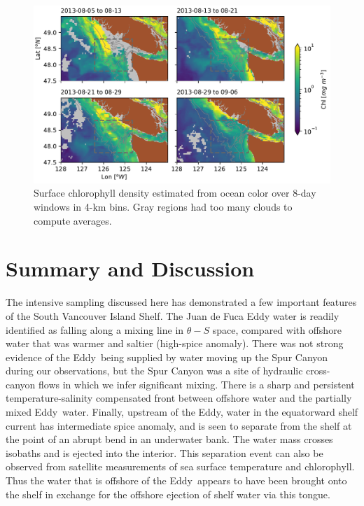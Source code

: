 \documentclass[draft]{agujournal2019}
\newcommand*{\Eddy}{{\sc Eddy}}
\begin{document}
\begin{figure}[htbp]
  \begin{center}
    \includegraphics[width=6.2in]{ChlA}
    \caption{Surface chlorophyll density estimated from ocean color \cite{Huetal12,MODISChlL3} over 8-day windows in 4-km bins. Gray regions had too many clouds to compute averages.
      \label{fig:ChlA} }
  \end{center}
\end{figure}


\section{Summary and Discussion}
\label{sec:Summary}

The intensive sampling discussed here has demonstrated a few important features of the South Vancouver Island Shelf.  The Juan de Fuca Eddy water is readily identified as falling along a mixing line in $\theta-S$ space, compared with offshore water that was warmer and saltier (high-spice anomaly).   There was not strong evidence of the \Eddy\ being supplied by water moving up the Spur Canyon during our observations, but the Spur Canyon was a site of hydraulic cross-canyon flows in which we infer significant mixing. There is a sharp and persistent temperature-salinity compensated front between offshore water and the partially mixed \Eddy\ water.  Finally, upstream of the \Eddy, water in the equatorward shelf current has intermediate spice anomaly, and is seen to separate from the shelf at the point of an abrupt bend in an underwater bank.  The water mass crosses isobaths and is ejected into the interior. This separation event can also be observed from satellite measurements of sea surface temperature and chlorophyll.  Thus the water that is offshore of the \Eddy\ appears to have been brought onto the shelf in exchange for the offshore ejection of shelf water via this tongue.
\end{document}
